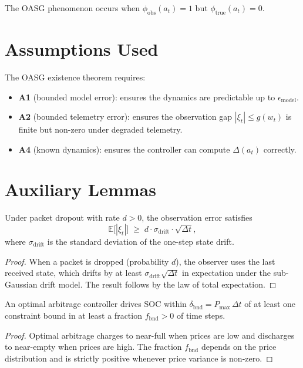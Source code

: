 The OASG phenomenon occurs when $\phi_{\text{obs}}(a_t) = 1$ but
$\phi_{\text{true}}(a_t) = 0$.

\section{Assumptions Used}

The OASG existence theorem requires:
\begin{itemize}
  \item \textbf{A1} (bounded model error): ensures the dynamics are
    predictable up to $\epsilon_{\text{model}}$.
  \item \textbf{A2} (bounded telemetry error): ensures the observation
    gap $|\xi_t| \le g(w_t)$ is finite but non-zero under degraded
    telemetry.
  \item \textbf{A4} (known dynamics): ensures the controller can compute
    $\Delta(a_t)$ correctly.
\end{itemize}

\section{Auxiliary Lemmas}

\begin{lemma}
\label{lem:obs-gap-dropout}
Under packet dropout with rate $d > 0$, the observation error satisfies
\[
  \mathbb{E}\bigl[|\xi_t|\bigr] \;\ge\; d \cdot \sigma_{\text{drift}} \cdot
  \sqrt{\Delta t},
\]
where $\sigma_{\text{drift}}$ is the standard deviation of the one-step
state drift.
\end{lemma}

\begin{proof}
When a packet is dropped (probability $d$), the observer uses the last
received state, which drifts by at least $\sigma_{\text{drift}}\sqrt{\Delta t}$
in expectation under the sub-Gaussian drift model.  The result follows
by the law of total expectation.
\end{proof}

\begin{lemma}
\label{lem:boundary-proximity}
An optimal arbitrage controller drives SOC within
$\delta_{\text{bnd}} = P_{\max}\,\Delta t$ of at least one constraint
bound in at least a fraction $f_{\text{bnd}} > 0$ of time steps.
\end{lemma}

\begin{proof}
Optimal arbitrage charges to near-full when prices are low and discharges
to near-empty when prices are high.  The fraction $f_{\text{bnd}}$
depends on the price distribution and is strictly positive whenever
price variance is non-zero.
\end{proof}

